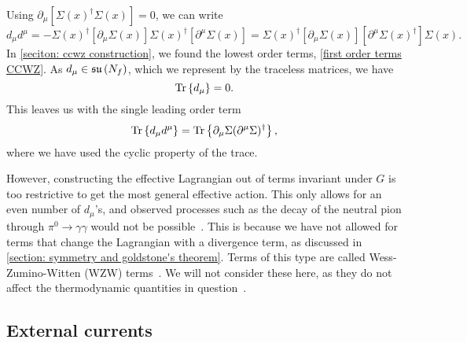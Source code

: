 %
Using $\partial_\mu [\Sigma(x)^\dagger\Sigma(x)] = 0 $, we can write
\begin{equation}
    d_\mu d^\mu = 
    - \Sigma(x)^\dagger [\partial_\mu \Sigma(x)] \Sigma(x)^\dagger [\partial^\mu \Sigma(x)]
    =\Sigma(x)^\dagger [\partial_\mu \Sigma(x)] [\partial^\mu \Sigma(x)^\dagger] \Sigma(x).
\end{equation}
%
In \autoref{seciton: ccwz construction}, we found the lowest order terms, \autoref{first order terms CCWZ}.
As $d_\mu \in \mathfrak{su}\left(N_f\right)$, which we represent by the traceless matrices, we have
%
\begin{equation}
    \text{Tr} \left\{ d_\mu \right\} = 0.
\end{equation}
%
This leaves us with the single leading order term
\begin{equation}
    \text{Tr} \left\{ d_\mu d^\mu \right\} = \text{Tr} \left\{ \partial_\mu \Sigma (\partial^\mu \Sigma)^\dagger \right\},
\end{equation}
%
where we have used the cyclic property of the trace.


However, constructing the effective Lagrangian out of terms invariant under $G$ is too restrictive to get the most general effective action.
This only allows for an even number of $d_\mu$'s, and observed processes such as the decay of the neutral pion through $\pi^0 \rightarrow \gamma \gamma$ would not be possible~\cite{schererIntroductionChiralPerturbation2002}.
This is because we have not allowed for terms that change the Lagrangian with a divergence term, as discussed in \autoref{section: symmetry and goldstone's theorem}.
Terms of this type are called Wess-Zumino-Witten (WZW) terms~\cite{weinbergQuantumTheoryFields1996}.
We will not consider these here, as they do not affect the thermodynamic quantities in question~\cite{adhikariTwoflavorChiralPerturbation2019}.

\subsection{External currents}


